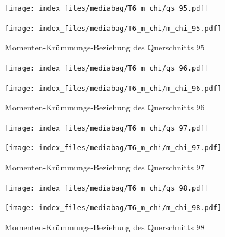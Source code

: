 \documentclass[
  11pt,
  letterpaper,
]{scrreprt}
\begin{document}
\begin{figure}[H]

\begin{minipage}{0.50\linewidth}
\texttt{[image: index\_files/mediabag/T6\_m\_chi/qs\_95.pdf]}\end{minipage}%
%
\begin{minipage}{0.50\linewidth}
\texttt{[image: index\_files/mediabag/T6\_m\_chi/m\_chi\_95.pdf]}\end{minipage}%

\caption{\label{fig-m_chi_appendix}Momenten-Krümmungs-Beziehung des
Querschnitts 95}

\end{figure}%

\begin{figure}[H]

\begin{minipage}{0.50\linewidth}
\texttt{[image: index\_files/mediabag/T6\_m\_chi/qs\_96.pdf]}\end{minipage}%
%
\begin{minipage}{0.50\linewidth}
\texttt{[image: index\_files/mediabag/T6\_m\_chi/m\_chi\_96.pdf]}\end{minipage}%

\caption{\label{fig-m_chi_appendix}Momenten-Krümmungs-Beziehung des
Querschnitts 96}

\end{figure}%

\begin{figure}[H]

\begin{minipage}{0.50\linewidth}
\texttt{[image: index\_files/mediabag/T6\_m\_chi/qs\_97.pdf]}\end{minipage}%
%
\begin{minipage}{0.50\linewidth}
\texttt{[image: index\_files/mediabag/T6\_m\_chi/m\_chi\_97.pdf]}\end{minipage}%

\caption{\label{fig-m_chi_appendix}Momenten-Krümmungs-Beziehung des
Querschnitts 97}

\end{figure}%

\begin{figure}[H]

\begin{minipage}{0.50\linewidth}
\texttt{[image: index\_files/mediabag/T6\_m\_chi/qs\_98.pdf]}\end{minipage}%
%
\begin{minipage}{0.50\linewidth}
\texttt{[image: index\_files/mediabag/T6\_m\_chi/m\_chi\_98.pdf]}\end{minipage}%

\caption{\label{fig-m_chi_appendix}Momenten-Krümmungs-Beziehung des
Querschnitts 98}

\end{figure}%
\end{document}

